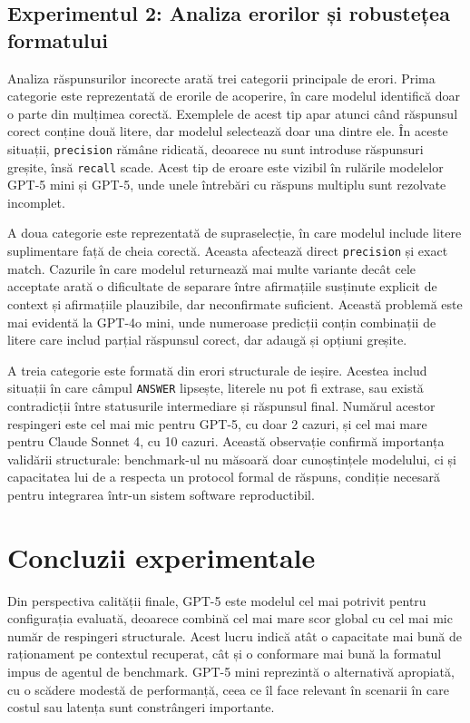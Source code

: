 \documentclass[12pt, a4paper, oneside, romanian]{teza-upb}
\begin{document}
\subsection{Experimentul 2: Analiza erorilor și robustețea formatului}

Analiza răspunsurilor incorecte arată trei categorii principale de erori. Prima categorie este reprezentată de erorile de acoperire, în care modelul identifică doar o parte din mulțimea corectă. Exemplele de acest tip apar atunci când răspunsul corect conține două litere, dar modelul selectează doar una dintre ele. În aceste situații, \texttt{precision} rămâne ridicată, deoarece nu sunt introduse răspunsuri greșite, însă \texttt{recall} scade. Acest tip de eroare este vizibil în rulările modelelor GPT-5 mini și GPT-5, unde unele întrebări cu răspuns multiplu sunt rezolvate incomplet.

A doua categorie este reprezentată de supraselecție, în care modelul include litere suplimentare față de cheia corectă. Aceasta afectează direct \texttt{precision} și exact match. Cazurile în care modelul returnează mai multe variante decât cele acceptate arată o dificultate de separare între afirmațiile susținute explicit de context și afirmațiile plauzibile, dar neconfirmate suficient. Această problemă este mai evidentă la GPT-4o mini, unde numeroase predicții conțin combinații de litere care includ parțial răspunsul corect, dar adaugă și opțiuni greșite.

A treia categorie este formată din erori structurale de ieșire. Acestea includ situații în care câmpul \texttt{ANSWER} lipsește, literele nu pot fi extrase, sau există contradicții între statusurile intermediare și răspunsul final. Numărul acestor respingeri este cel mai mic pentru GPT-5, cu doar 2 cazuri, și cel mai mare pentru Claude Sonnet 4, cu 10 cazuri. Această observație confirmă importanța validării structurale: benchmark-ul nu măsoară doar cunoștințele modelului, ci și capacitatea lui de a respecta un protocol formal de răspuns, condiție necesară pentru integrarea într-un sistem software reproductibil.

\section{Concluzii experimentale}

Din perspectiva calității finale, GPT-5 este modelul cel mai potrivit pentru configurația evaluată, deoarece combină cel mai mare scor global cu cel mai mic număr de respingeri structurale. Acest lucru indică atât o capacitate mai bună de raționament pe contextul recuperat, cât și o conformare mai bună la formatul impus de agentul de benchmark. GPT-5 mini reprezintă o alternativă apropiată, cu o scădere modestă de performanță, ceea ce îl face relevant în scenarii în care costul sau latența sunt constrângeri importante.
\end{document}
